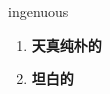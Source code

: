 
\begin{frame}
{\huge ingenuous}
\begin{center}
\begin{enumerate}\Large
  \item \textbf{天真纯朴的}
  \item \textbf{坦白的}
\end{enumerate}
\end{center}
\end{frame}
